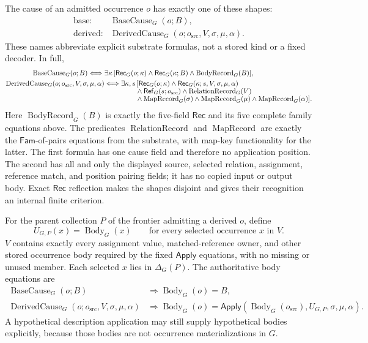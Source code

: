 \documentclass[11pt,twoside]{article}
\newcommand{\Apply}{\mathsf{Apply}}
\newcommand{\Rec}{\mathsf{Rec}}
\newcommand{\Fam}{\mathsf{Fam}}
\newcommand{\RefPos}{\mathsf{Ref}}
\begin{document}
The cause of an admitted occurrence \(o\) has exactly one of these shapes:
\[
\begin{array}{ll}
\text{base:}    & \operatorname{BaseCause}_G(o;B),\\[0.2em]
\text{derived:} & \operatorname{DerivedCause}_G
                    (o;o_{\mathrm{src}},V,\sigma,\mu,\alpha).
\end{array}
\]
These names abbreviate explicit substrate formulas, not a stored kind or a fixed
decoder.  In full,
\[
\begin{split}
 \operatorname{BaseCause}_G(o;B)\Longleftrightarrow{}&
 \exists\kappa\,[\Rec_G(o;\kappa)\land\Rec_G(\kappa;B)
                 \land\operatorname{BodyRecord}_G(B)],\\
 \operatorname{DerivedCause}_G
   (o;o_{\mathrm{src}},V,\sigma,\mu,\alpha)
 &\Longleftrightarrow
 \exists\kappa,s\,[\Rec_G(o;\kappa)
       \land\Rec_G(\kappa;s,V,\sigma,\mu,\alpha)\\[-0.4em]
 &\hspace{4.5em}{}\land\RefPos_G(s;o_{\mathrm{src}})
       \land\operatorname{RelationRecord}_G(V)\\[-0.4em]
 &\hspace{4.5em}{}\land\operatorname{MapRecord}_G(\sigma)
       \land\operatorname{MapRecord}_G(\mu)
       \land\operatorname{MapRecord}_G(\alpha)].
\end{split}
\]
Here \(\operatorname{BodyRecord}_G(B)\) is exactly the five-field \(\Rec\) and
its five complete family equations above.  The predicates
\(\operatorname{RelationRecord}\) and
\(\operatorname{MapRecord}\) are exactly the \(\Fam\)-of-pairs equations from the
substrate, with map-key functionality for the latter.  The first formula has one
cause field and therefore no application position.  The second has all and only
the displayed source, selected relation, assignment, reference match, and position
pairing fields; it has no copied input or output body.  Exact \(\Rec\) reflection
makes the shapes disjoint and gives their recognition an internal finite criterion.

For the parent collection \(P\) of the frontier admitting a derived \(o\), define
\[
  U_{G,P}(x)=\operatorname{Body}_G(x)
  \qquad\text{for every selected occurrence }x\text{ in }V.
\]
\(V\) contains exactly every assignment value, matched-reference owner, and other
stored occurrence body required by the fixed \(\Apply\) equations, with no missing
or unused member.  Each selected \(x\) lies in \(\Delta_G(P)\).  The authoritative
body equations are
\[
\begin{aligned}
 \operatorname{BaseCause}_G(o;B)
   &\Longrightarrow \operatorname{Body}_G(o)=B,\\
 \operatorname{DerivedCause}_G(o;o_{\mathrm{src}},V,\sigma,\mu,\alpha)
   &\Longrightarrow
   \operatorname{Body}_G(o)=
     \Apply(\operatorname{Body}_G(o_{\mathrm{src}}),
            U_{G,P},\sigma,\mu,\alpha).
\end{aligned}
\]
A hypothetical description application may still supply hypothetical bodies
explicitly, because those bodies are not occurrence materializations in \(G\).
\end{document}
